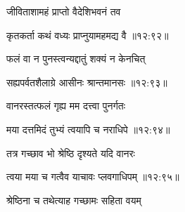 {\devanagarifont जीविताशामहं प्राप्तो वैदेशिभवनं तव \thinspace{\danda} \dontdisplaylinenum }%
 

{\devanagarifont कृतकर्ता कथं वध्यः प्राप्नुयामहमद्य वै {॥१२:९२॥} \veg\dontdisplaylinenum }%

{\devanagarifont फलं वा न पुनस्त्वन्यद्दातुं शक्यं न केनचित् \thinspace{\dandab} \dontdisplaylinenum }%


{\devanagarifont सह्यपर्वतशैलाग्रे आसीनः श्रान्तमानसः {॥१२:९३॥} \veg\dontdisplaylinenum }%

{\devanagarifont वानरस्तत्फलं गृह्य मम दत्त्वा पुनर्गतः \thinspace{\dandab} \dontdisplaylinenum }%


{\devanagarifont मया दत्तमिदं तुभ्यं त्वयापि च नराधिपे {॥१२:९४॥} \veg\dontdisplaylinenum }%

{\devanagarifont तत्र गच्छाव भो श्रेष्ठि दृश्यते यदि वानरः \thinspace{\dandab} \dontdisplaylinenum }%
 

{\devanagarifont त्वया मया च गत्वैव याचावः प्लवगाधिपम् {॥१२:९५॥} \veg\dontdisplaylinenum }%

{\devanagarifont श्रेष्ठिना च तथेत्याह गच्छामः सहिता वयम् \thinspace{\dandab} \dontdisplaylinenum }%

